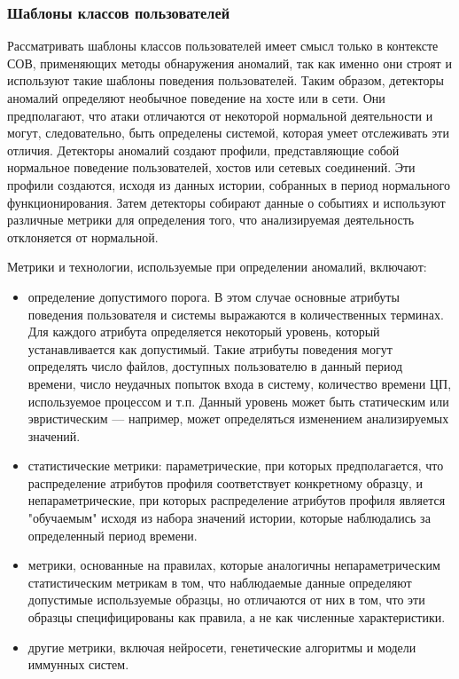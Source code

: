 \subsubsection{Шаблоны классов пользователей}

Рассматривать шаблоны классов пользователей имеет смысл только в контексте СОВ, применяющих методы 
обнаружения аномалий, так как именно они строят и используют такие шаблоны поведения пользователей.
Таким образом, детекторы аномалий определяют необычное поведение на хосте или в сети. 
Они предполагают, что атаки отличаются от некоторой нормальной деятельности и могут, следовательно, 
быть определены системой, которая умеет отслеживать эти отличия. Детекторы аномалий создают профили, 
представляющие собой нормальное поведение пользователей, хостов или сетевых соединений. 
Эти профили создаются, исходя из данных истории, собранных в период нормального функционирования. 
Затем детекторы собирают данные о событиях и используют различные метрики для определения того, 
что анализируемая деятельность отклоняется от нормальной.

Метрики и технологии, используемые при определении аномалий, включают:

\begin{itemize}
	\item определение допустимого порога. В этом случае основные атрибуты поведения пользователя и системы 
	выражаются в количественных терминах. Для каждого атрибута определяется некоторый уровень, который 
	устанавливается как допустимый. Такие атрибуты поведения могут определять число файлов, доступных 
	пользователю в данный период времени, число неудачных попыток входа в систему, количество времени ЦП, 
	используемое процессом и т.п. Данный уровень может быть статическим или эвристическим — например, может 
	определяться изменением анализируемых значений.
	\item статистические метрики: параметрические, при которых предполагается, что распределение 
	атрибутов профиля соответствует конкретному образцу, и непараметрические, при которых распределение 
	атрибутов профиля является "обучаемым" исходя из набора значений истории, которые наблюдались за 
	определенный период времени.
	\item метрики, основанные на правилах, которые аналогичны непараметрическим статистическим метрикам в 
	том, что наблюдаемые данные определяют допустимые используемые образцы, но отличаются от них в том, 
	что эти образцы специфицированы как правила, а не как численные характеристики.
	\item другие метрики, включая нейросети, генетические алгоритмы и модели иммунных систем.
\end{itemize}


